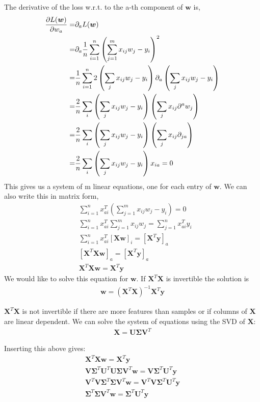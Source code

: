 The derivative of the loss w.r.t. to the a-th component of $\bm{w}$ is,
\begin{align}
    \pdv{L(\bm{w})}{w_{a}} =& \partial_a L(\bm{w}) \\
    =&\partial_a \frac{1}{n} \sum_{i=1}^{n}\left(\sum_{j=1}^{m}x_{ij}w_{j}-y_{i}\right)^2\\
    =&\frac{1}{n}\sum_{i=1}^{n}2\left(\sum_{j}x_{ij}w_{j}-y_{i}\right)\partial_a \left(\sum_{j}x_{ij}w_{j}-y_{i}\right)\\
    =&\frac{2}{n}\sum_{i} \left(\sum_{j}x_{ij}w_{j}-y_{i}\right)\left(\sum_{j}x_{ij}\partial^a w_{j}\right)\\
    =&\frac{2}{n}\sum_{i} \left(\sum_{j}x_{ij}w_{j}-y_{i}\right)\left(\sum_{j}x_{ij}\partial_{ja}\right)\\
    =&\frac{2}{n} \sum_{i}\left(\sum_{j}x_{ij}w_{j}-y_{i}\right)x_{ia}= 0
\end{align}
This gives us a system of m linear equations, one for each entry of $\bm{w}$.
We can also write this in matrix form,
\begin{align}
    &\sum_{i=1}^{n} x_{ai}^T\left(\sum_{j=1}^{m}x_{ij}w_{j}-y_{i}\right)=0 \\
    &\sum_{i=1}^{n} x_{ai}^T \sum_{j=1}^{m} x_{ij} w_{j} = \sum_{j=1}^{n}x_{ai}^T y_{i}\\
    &\sum_{i=1}^{n} x_{ai}^T [\bm{Xw}]_i = [\bm{X}^T\bm{y}]_a\\
    &[\bm{X}^T\bm{Xw}]_a = [\bm{X}^T\bm{y}]_a\\
    &\bm{X}^T\bm{Xw}  = \bm{X}^T\bm{y}
\end{align}
We would like to solve this equation for $\bm{w}$.
If $\bm{X}^T\bm{X}$ is invertible the solution is 
\begin{align}
    \bm{w}=(\bm{X}^T\bm{X})^{-1} \bm{X}^T \bm{y}
\end{align}

$\bm{X}^T \bm{X}$ is not invertible if there are more features than samples or if columns of $\bm{X}$ are linear dependent. 
We can solve the system of equations using the SVD of $\bm{X}$:
\begin{align}
    \bm{X}=\bm{U\Sigma V}^T    
\end{align}

Inserting this above gives:
\begin{align}
    \bm{X}^T\bm{Xw}  = \bm{X}^T\bm{y} \\
    \bm{V}\bm{\Sigma}^T \bm{U}^T \bm{U\Sigma V}^T \bm{w}  = \bm{V\Sigma}^T\bm{U}^T \bm{y} \\
    \bm{V}^T\bm{V}\bm{\Sigma}^T \bm{\Sigma V}^T \bm{w}  = \bm{V}^T\bm{V\Sigma}^T\bm{U}^T \bm{y} \\
    \bm{\Sigma}^T \bm{\Sigma V}^T \bm{w}  = \bm{\Sigma}^T\bm{U}^T \bm{y} \\
\end{align}

